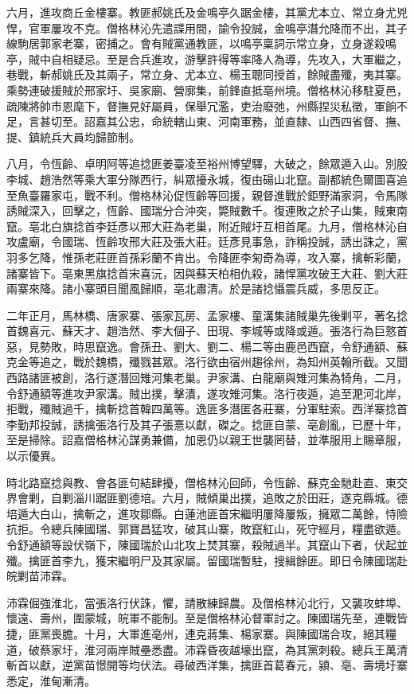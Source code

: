 \begin{pinyinscope}
六月，進攻商丘金樓寨。教匪郝姚氏及金鳴亭久踞金樓，其黨尤本立、常立身尤兇悍，官軍屢攻不克。僧格林沁先遣諜用間，諭令投誠，金鳴亭潛允降而不出，其子線駒居郭家老寨，密捕之。會有賊黨通教匪，以鳴亭稟詞示常立身，立身遂殺鳴亭，賊中自相疑忌。至是合兵進攻，游擊許得等率降人為導，先攻入，大軍繼之，巷戰，斬郝姚氏及其兩子，常立身、尤本立、楊玉聰同授首，餘賊盡殲，夷其寨。乘勢連破援賊於邢家圩、吳家廟、營廓集，前鋒直抵亳州境。僧格林沁移駐夏邑，疏陳將帥市恩麾下，督撫見好屬員，保舉冗濫，吏治廢弛，州縣捏災私徵，軍餉不足，言甚切至。詔嘉其公忠，命統轄山東、河南軍務，並直隸、山西四省督、撫、提、鎮統兵大員均歸節制。

八月，令恆齡、卓明阿等追捻匪姜臺凌至裕州博望驛，大破之，餘眾遁入山。別股李城、趙浩然等乘大軍分隊西行，糾眾擾永城，復由碭山北竄。副都統色爾圖喜追至魚臺羅家屯，戰不利。僧格林沁促恆齡等回援，親督進戰於鉅野滿家洞，令馬隊誘賊深入，回擊之，恆齡、國瑞分合沖突，斃賊數千。復連敗之於子山集，賊東南竄。亳北白旗捻首李廷彥以邢大莊為老巢，附近賊圩互相首尾。九月，僧格林沁自攻盧廟，令國瑞、恆齡攻邢大莊及張大莊。廷彥見事急，詐稱投誠，誘出誅之，黨羽多乞降，惟孫老莊匪首孫彩蘭不肯出。令降匪李匊奇為導，攻入寨，擒斬彩蘭，諸寨皆下。亳東黑旗捻首宋喜沅，因與蘇天柏相仇殺，諸悍黨攻破王大莊、劉大莊兩寨來降。諸小寨頭目聞風歸順，亳北肅清。於是諸捻懾震兵威，多思反正。

二年正月，馬林橋、唐家寨、張家瓦房、孟家樓、童溝集諸賊巢先後剿平，著名捻首魏喜元、蘇天才、趙浩然、李大個子、田現、李城等或降或遁。張洛行為巨憝首惡，見勢敗，時思竄逸。會孫丑、劉大、劉二、楊二等由鹿邑西竄，令舒通額、蘇克金等追之，戰於魏橋，殲戮甚眾。洛行欲由宿州趨徐州，為知州英翰所截。又聞西路諸匪被創，洛行遂潛回雉河集老巢。尹家溝、白龍廟與雉河集為犄角，二月，令舒通額等進攻尹家溝。賊出撲，擊潰，遂攻雉河集。洛行夜遁，追至淝河北岸，拒戰，殲賊過千，擒斬捻首韓四萬等。逸匪多潛匿各莊寨，分軍駐索。西洋寨捻首李勤邦投誠，誘擒張洛行及其子張憙以獻，磔之。捻匪自蒙、亳創亂，已歷十年，至是掃除。詔嘉僧格林沁謀勇兼備，加恩仍以親王世襲罔替，並準服用上賜章服，以示優異。

時北路竄捻與教、會各匪句結肆擾，僧格林沁回師，令恆齡、蘇克金馳赴直、東交界會剿，自剿淄川踞匪劉德培。六月，賊傾巢出撲，追敗之於田莊，遂克縣城。德培遁大白山，擒斬之，進攻鄒縣。白蓮池匪首宋繼明屢降屢叛，擁眾二萬餘，恃險抗拒。令總兵陳國瑞、郭寶昌猛攻，破其山寨，敗竄紅山，死守經月，糧盡欲遁。令舒通額等設伏嶺下，陳國瑞於山北攻上焚其寨，殺賊過半。其竄山下者，伏起並殲。擒匪首李九，獲宋繼明尸及其家屬。留國瑞暫駐，搜緝餘匪。即日令陳國瑞赴皖剿苗沛霖。

沛霖倔強淮北，當張洛行伏誅，懼，請散練歸農。及僧格林沁北行，又襲攻蚌埠、懷遠、壽州，圍蒙城，皖軍不能制。至是僧格林沁督軍討之。陳國瑞先至，連戰皆捷，匪黨喪膽。十月，大軍進亳州，連克蔣集、楊家寨。與陳國瑞合攻，絕其糧道，破蔡家圩，淮河兩岸賊壘悉盡。沛霖昏夜越壕出竄，為其黨刺殺。總兵王萬清斬首以獻，逆黨苗憬開等均伏法。尋破西洋集，擒匪首葛春元，潁、亳、壽境圩寨悉定，淮甸漸清。


\end{pinyinscope}
